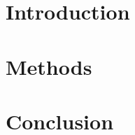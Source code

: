 \documentclass[12pt]{article}
\begin{document}

{\hypersetup{linkcolor=black}\tableofcontents}
\newpage
\section{Introduction}




\section{Methods}




\section{Conclusion}



\printbibliography
\end{document}
